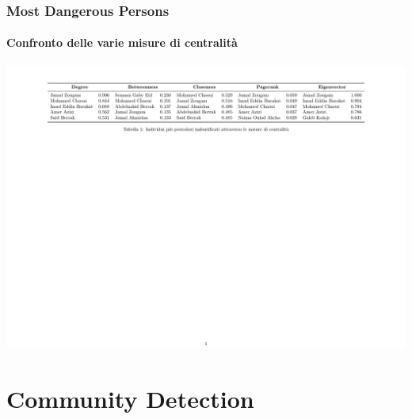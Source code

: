 \documentclass[hyperref={pdfpagelabels=false}]{beamer}
\begin{document}




\begin{frame}
\frametitle{Most Dangerous Persons}
\framesubtitle{Confronto delle varie misure di centralità}
\centering
\includegraphics[scale=0.5]{images/most_dangerous.pdf}

\end{frame}

\section{Community Detection}
\end{document}
